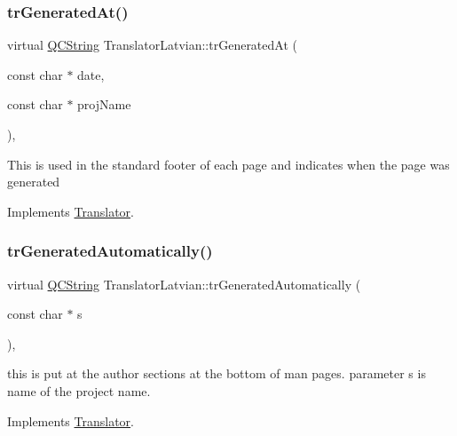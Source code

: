 \mbox{\label{class_translator_latvian_a60247f59577ac687897555055563678d}} 
\subsubsection{\texorpdfstring{trGeneratedAt()}{trGeneratedAt()}}
{\footnotesize\ttfamily virtual \mbox{\hyperlink{class_q_c_string}{Q\+C\+String}} Translator\+Latvian\+::tr\+Generated\+At (\begin{DoxyParamCaption}\item[{const char $\ast$}]{date,  }\item[{const char $\ast$}]{proj\+Name }\end{DoxyParamCaption})\hspace{0.3cm}{\ttfamily [inline]}, {\ttfamily [virtual]}}

This is used in the standard footer of each page and indicates when the page was generated 

Implements \mbox{\hyperlink{class_translator}{Translator}}.

\mbox{\label{class_translator_latvian_a88bcd9823d0e18700afc19486b8b5f51}} 
\subsubsection{\texorpdfstring{trGeneratedAutomatically()}{trGeneratedAutomatically()}}
{\footnotesize\ttfamily virtual \mbox{\hyperlink{class_q_c_string}{Q\+C\+String}} Translator\+Latvian\+::tr\+Generated\+Automatically (\begin{DoxyParamCaption}\item[{const char $\ast$}]{s }\end{DoxyParamCaption})\hspace{0.3cm}{\ttfamily [inline]}, {\ttfamily [virtual]}}

this is put at the author sections at the bottom of man pages. parameter s is name of the project name. 

Implements \mbox{\hyperlink{class_translator}{Translator}}.

